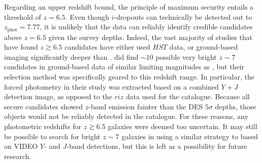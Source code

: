 Regarding an upper redshift bound, the principle of maximum security entails a threshold of $z=6.5$. Even though $i$-dropouts can technically be detected out to $z_{\mathrm{phot}}=7.77$, it is unlikely that the \DESVIDEO data can reliably identify credible candidates above $z=6.5$ given the survey depths. Indeed, the vast majority of studies that have found $z\gtrsim 6.5$ candidates have either used $HST$ data, or ground-based imaging significantly deeper than \DESVIDEO \citep{2010ApJ...709L..16O,2010MNRAS.403..960M,2015ApJ...803...34B, 2014MNRAS.440.2810B}. \cite{2012MNRAS.426.2772B} did find $\sim10$ possible very bright $z\sim 7$ candidates in ground-based data of similar limiting magnitudes as \DESVIDEO, but their selection method was specifically geared to this redshift range. In particular, the forced photometry in their study was extracted based on a combined $Y+J$ detection image, as opposed to the $riz$ data used for the \DESVIDEO catalogue. Because all secure \cite{2012MNRAS.426.2772B} candidates showed $z$-band emission fainter than the DES $5\sigma$ depths, those objects would not be reliably detected in the \DESVIDEO catalogue. For these reasons, any photometric redshifts for $z\gtrsim6.5$ galaxies were deemed too uncertain. It may still be possible to search for bright $z\sim7$ galaxies in \DESVIDEO using a similar strategy to \cite{2012MNRAS.426.2772B} based on VIDEO $Y$- and $J$-band detections, but this is left as a possibility for future research. \par 

